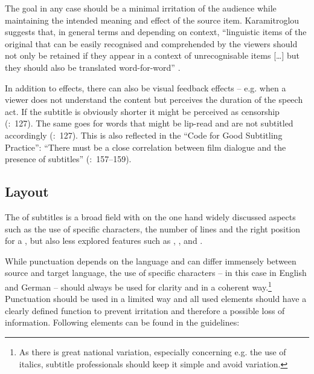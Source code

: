 The goal in any case should be a minimal irritation of the audience while maintaining the intended meaning and effect of the source item. Karamitroglou suggests that, in general terms and depending on context, “linguistic items of the original that can be easily recognised and comprehended by the viewers should not only be retained if they appear in a context of unrecognisable items […] but they should also be translated word-for-word” \citep{Karamitroglou1998}.

In addition to  effects, there can also be visual feedback effects – e.g. when a viewer does not understand the content but perceives the duration of the speech act. If the subtitle is obviously shorter it might be perceived as censorship (\citealt{Jungst2010}:~127). The same goes for words that might be lip-read and are not subtitled accordingly (\citealt{Jungst2010}:~127). This is also reflected in the “Code for Good Subtitling Practice”: “There must be a close correlation between film dialogue and the presence of subtitles” (\citealt{Ivarsson1998}:~157--159).

\subsection{Layout}\label{sec:1.2.3}

The  of subtitles is a broad field with on the one hand widely discussed aspects such as the use of specific characters, the number of lines and the right position for a , but also less explored features such as , , and .

\largerpage
While punctuation  {depends on the language } and can differ immensely between source and target language, the use of specific characters – in this case in English and German – should always be used for clarity and in a coherent way.\footnote{As there is great national variation, especially concerning e.g. the use of italics, subtitle professionals should keep it simple and avoid variation.} Punctuation should be used in a limited way and all used elements should have a clearly defined function to prevent irritation and therefore a possible loss of information. Following elements can be found in the guidelines:

